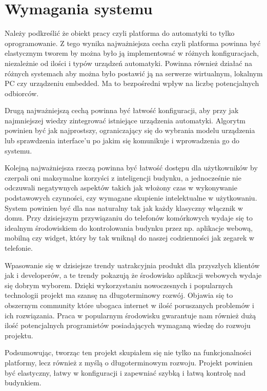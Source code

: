 \chapter{Wymagania systemu}
Należy podkreślić że obiekt pracy czyli platforma do automatyki to tylko oprogramowanie. Z tego wynika najważniejsza cecha czyli platforma powinna być elastycznym tworem by można było ją implementować w różnych konfiguracjach,  niezależnie od ilości i typów urządzeń automatyki. Powinna również działać na różnych systemach aby można było postawić ją na serwerze wirtualnym, lokalnym PC czy urządzeniu embedded. Ma to bezpośredni wpływ na liczbę potencjalnych odbiorców. \par Drugą najważniejszą cechą powinna być łatwość konfiguracji, aby przy jak najmniejszej wiedzy zintegrować istniejące urządzenia automatyki. Algorytm powinien być jak najprostszy, ograniczający się do wybrania modelu urządzenia lub sprawdzenia interface'u po jakim się komunikuje i wprowadzenia go do systemu. 
\par Kolejną najważniejsza rzeczą powinna być łatwość dostępu dla użytkowników by czerpali oni maksymalne korzyści z inteligencji budynku, a jednocześnie nie odczuwali negatywnych aspektów takich jak włożony czas w wykonywanie podstawowych czynności, czy wymagane skupienie intelektualne w użytkowaniu. System powinien być dla nas naturalny tak jak każdy klasyczny włącznik w domu. Przy dzisiejszym przywiązaniu do telefonów komórkowych wydaje się to idealnym środowiskiem do kontrolowania budynku przez np. aplikacje webową, mobilną czy widget, który by tak wniknął do naszej codzienności jak zegarek w telefonie. \par
Wpasowanie się w dzisiejsze trendy uatrakcyjnia produkt dla przyszłych klientów jak i developerów, a te trendy pokazują że środowisko aplikacji webowych wydaje się dobrym wyborem. Dzięki wykorzystaniu nowoczesnych i popularnych technologii projekt ma szansę na długoterminowy rozwój. Objawia się to obszernym community które ubogaca internet w ilość poruszanych problemów i ich rozwiązania. Praca w popularnym środowisku gwarantuje nam również dużą ilość potencjalnych programistów posiadających wymaganą wiedzę do rozwoju projektu.
\par Podsumowując, tworząc ten projekt skupiałem się nie tylko na funkcjonalności platformy, lecz również z myślą o długoterminowym rozwoju. Projekt powinien być elastyczny, łatwy w konfiguracji i zapewniać szybką i łatwą kontrolę nad budynkiem. 
